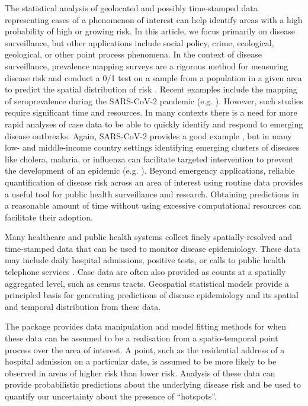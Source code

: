 The statistical analysis of geolocated and possibly time-stamped data representing cases of a phenomenon of interest can help identify areas with a high probability of high or growing risk. In this article, we focus primarily on disease surveillance, but other applications include social policy, crime, ecological, geological, or other point process phenomena. In the context of disease surveillance, prevalence mapping surveys are a rigorous method for measuring disease risk and conduct a 0/1 test on a sample from a population in a given area to predict the spatial distribution of risk \citep{Diggle2016}. Recent examples include the mapping of seroprevalence during the SARS-CoV-2 pandemic (e.g. \citet{Riley2020}). However, such studies require significant time and resources. In many contexts there is a need for more rapid analyses of case data to be able to quickly identify and respond to emerging disease outbreaks. Again, SARS-CoV-2 provides a good example \citep{Watson2021a}, but in many low- and middle-income country settings identifying emerging clusters of diseases like cholera, malaria, or influenza can facilitate targeted intervention to prevent the development of an epidemic (e.g. \citet{Ratnayake2020a,Ratnayake2020}). Beyond emergency applications, reliable quantification of disease risk across an area of interest using routine data provides a useful tool for public health surveillance and research. Obtaining predictions in a reasonable amount of time without using excessive computational resources can facilitate their adoption.

Many healthcare and public health systems collect finely spatially-resolved and time-stamped data that can be used to monitor disease epidemiology. These data may include daily hospital admissions, positive tests, or calls to public health telephone services \citep{Diggle2005}. Case data are often also provided as counts at a spatially aggregated level, such as census tracts. Geospatial statistical models provide a principled basis for generating predictions of disease epidemiology and its spatial and temporal distribution from these data. 

The  package provides data manipulation and model fitting methods for when these data can be assumed to be a realisation from a spatio-temporal point process over the area of interest. A point, such as the residential address of a hospital admission on a particular date, is assumed to be more likely to be observed in areas of higher risk than lower risk. Analysis of these data can provide probabilistic predictions about the underlying disease risk and be used to quantify our uncertainty about the presence of ``hotspots''. 

